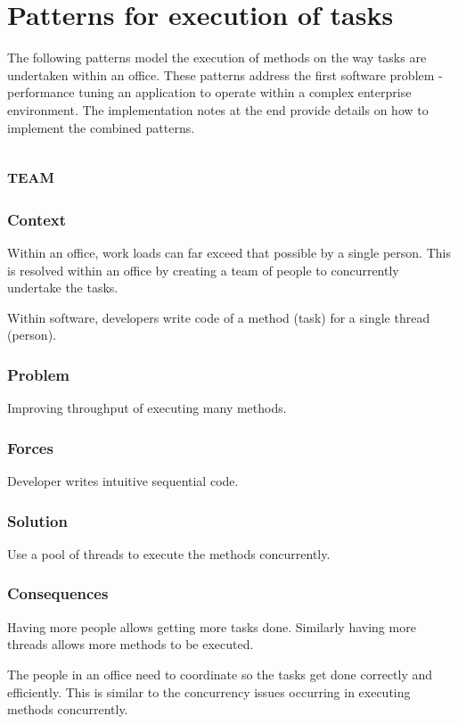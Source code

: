 \documentclass[prodmode]{style/acmlarge}
\begin{document}
\section{Patterns for execution of tasks}

The following patterns model the execution of methods on the way tasks are
undertaken within an office.  These patterns address the first software problem
- performance tuning an application to operate within a complex enterprise
environment.  The implementation notes at the end provide details on how to
implement the combined patterns.


\subsection{\textsc{\textbf{team}}}

\subsubsection*{Context} Within an office, work loads can far exceed that
possible by a single person. This is resolved within an office by creating a
team of people to concurrently undertake the tasks.

Within software, developers write code of a method (task) for a single thread
(person).

\subsubsection*{\textbf{Problem}} Improving throughput of executing many methods.

\subsubsection*{Forces} Developer writes intuitive sequential code.

\subsubsection*{\textbf{Solution}} Use a pool of threads to execute the methods
concurrently.

\subsubsection*{Consequences} Having more people allows getting more tasks done.
Similarly having more threads allows more methods to be executed.

The people in an office need to coordinate so the tasks get done correctly and
efficiently.  This is similar to the concurrency issues occurring in executing
methods concurrently.
\end{document}
